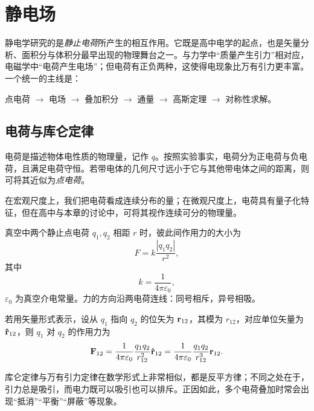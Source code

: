 \chapter{静电场}

静电学研究的是\emph{静止电荷}所产生的相互作用。它既是高中电学的起点，也是矢量分析、面积分与体积分最早出现的物理舞台之一。与力学中“质量产生引力”相对应，电磁学中“电荷产生电场”；但电荷有正负两种，这使得电现象比万有引力更丰富。一个统一的主线是：
\begin{center}
点电荷 $\to$ 电场 $\to$ 叠加积分 $\to$ 通量 $\to$ 高斯定理 $\to$ 对称性求解。
\end{center}

\section{电荷与库仑定律}

\begin{definition}[电荷与点电荷]
电荷是描述物体电性质的物理量，记作 $q$。按照实验事实，电荷分为正电荷与负电荷，且满足电荷守恒。若带电体的几何尺寸远小于它与其他带电体之间的距离，则可将其近似为\emph{点电荷}。
\end{definition}

在宏观尺度上，我们把电荷看成连续分布的量；在微观尺度上，电荷具有量子化特征，但在高中与本章的讨论中，可将其视作连续可分的物理量。

\begin{law}[库仑定律]
真空中两个静止点电荷 $q_1,q_2$ 相距 $r$ 时，彼此间作用力的大小为
\begin{equation}
F = k\frac{|q_1 q_2|}{r^2},
\end{equation}
其中
\begin{equation}
 k = \frac{1}{4\pi \varepsilon_0},
\end{equation}
$\varepsilon_0$ 为真空介电常量。力的方向沿两电荷连线：同号相斥，异号相吸。

若用矢量形式表示，设从 $q_1$ 指向 $q_2$ 的位矢为 $\vb{r}_{12}$，其模为 $r_{12}$，对应单位矢量为 $\vu{r}_{12}$，则 $q_1$ 对 $q_2$ 的作用力为
\begin{equation}
\vb{F}_{12} = \frac{1}{4\pi \varepsilon_0}\frac{q_1 q_2}{r_{12}^2}\vu{r}_{12}
= \frac{1}{4\pi \varepsilon_0}\frac{q_1 q_2}{r_{12}^3}\vb{r}_{12}.
\end{equation}
\end{law}

库仑定律与万有引力定律在数学形式上非常相似，都是反平方律；不同之处在于，引力总是吸引，而电力既可以吸引也可以排斥。正因如此，多个电荷叠加时常会出现“抵消”“平衡”“屏蔽”等现象。

